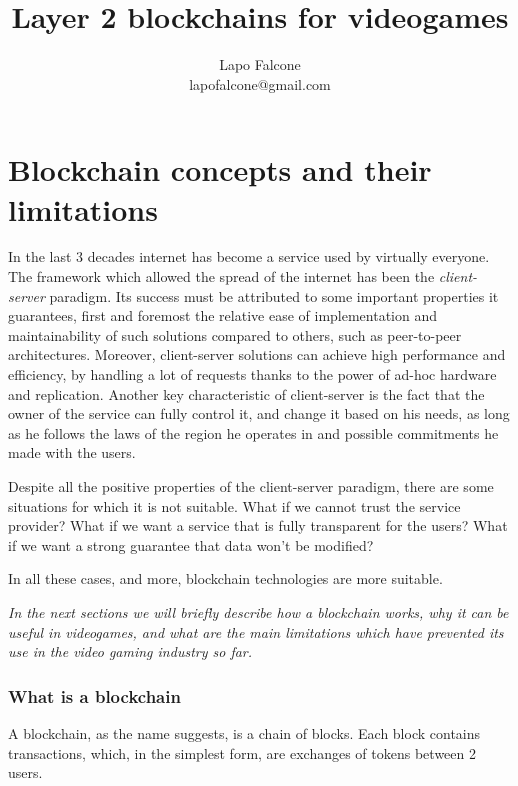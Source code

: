 \documentclass[11pt]{article}
\title{Layer 2 blockchains for videogames}
\author{Lapo Falcone \\ lapofalcone@gmail.com}
\begin{document}
\maketitle
\tableofcontents

\newpage

\part{Blockchain concepts and their limitations} \label{part:bcatl}
In the last 3 decades internet has become a service used by virtually everyone. The framework which allowed the spread of the internet has been the \textit{client-server} paradigm.
Its success must be attributed to some important properties it guarantees, first and foremost the relative ease of implementation and maintainability of such solutions compared to others, such as peer-to-peer architectures.
Moreover, client-server solutions can achieve high performance and efficiency, by handling a lot of requests thanks to the power of ad-hoc hardware and replication. 
Another key characteristic of client-server is the fact that the owner of the service can fully control it, and change it based on his needs, as long as he follows the laws of the region he operates in and possible commitments he made with the users.

Despite all the positive properties of the client-server paradigm, there are some situations for which it is not suitable. 
What if we cannot trust the service provider? What if we want a service that is fully transparent for the users? What if we want a strong guarantee that data won't be modified?

In all these cases, and more, blockchain technologies are more suitable.

\emph{In the next sections we will briefly describe how a blockchain works, why it can be useful in videogames, and what are the main limitations which have prevented its use in the video gaming industry so far.}

\section {What is a blockchain} \label{section:wiab}
A blockchain, as the name suggests, is a chain of blocks. Each block contains transactions, which, in the simplest form, are exchanges of tokens between 2 users.
\end{document}
